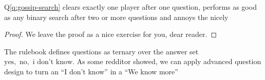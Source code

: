 \begin{claim}
    Q\ref{q:gossip-search} clears exactly one player after one question, performs
    as good as any binary search after two or more questions and annoys the \st{ }nicely
\end{claim}

\begin{proof}
    We leave the proof as a nice exercise for you, dear reader.
\end{proof}

\begin{remark}
    The rulebook defines questions as ternary over the answer set
    ${\text{yes},\text{ no},\text{ i don't know}}$.
    As some redditor\todo{} showed, we can apply advanced question design to turn an ``I don't know'' in a ``We know more''
\end{remark}